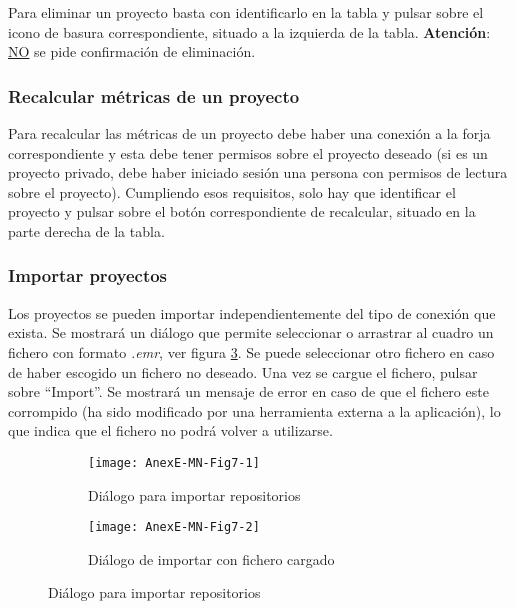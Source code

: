 Para eliminar un proyecto basta con identificarlo en la tabla y pulsar sobre el icono de basura correspondiente, situado a la izquierda de la tabla. \textbf{Atención}: \underline{NO} se pide confirmación de eliminación.

\subsubsection{Recalcular métricas de un proyecto}

Para recalcular las métricas de un proyecto debe haber una conexión a la forja correspondiente y esta debe tener permisos sobre el proyecto deseado (si es un proyecto privado, debe haber iniciado sesión una persona con permisos de lectura sobre el proyecto). Cumpliendo esos requisitos, solo hay que identificar el proyecto y pulsar sobre el botón correspondiente de recalcular, situado en la parte derecha de la tabla.

\subsubsection{Importar proyectos}
Los proyectos se pueden importar independientemente del tipo de conexión que exista. Se mostrará un diálogo que permite seleccionar o arrastrar al cuadro un fichero con formato \textit{.emr}, ver figura \ref{fig:AnexE-MN-Fig7}. Se puede seleccionar otro fichero en caso de haber escogido un fichero no deseado. Una vez se cargue el fichero, pulsar sobre ``Import''. Se mostrará un mensaje de error en caso de que el fichero este corrompido (ha sido modificado por una herramienta externa a la aplicación), lo que indica que el fichero no podrá volver a utilizarse.
\begin{figure}[!h]
	\centering
	\begin{subfigure}{.45\textwidth}
		\centering
		\texttt{[image: AnexE-MN-Fig7-1]}
		\caption{Diálogo para importar repositorios}
		\label{fig:AnexE-MN-Fig7-1}
	\end{subfigure}\hfill
	\begin{subfigure}{.45\textwidth}
		\centering
		\texttt{[image: AnexE-MN-Fig7-2]}
		\caption{Diálogo de importar con fichero cargado}
		\label{fig:AnexE-MN-Fig7-2}
	\end{subfigure}
	\caption{Diálogo para importar repositorios}
	\label{fig:AnexE-MN-Fig7}
\end{figure}

